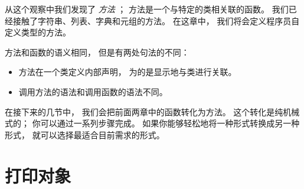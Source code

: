从这个观察中我们发现了 {\em 方法} ； 方法是一个与特定的类相关联的函数。
我们已经接触了字符串、列表、字典和元组的方法。
在这章中， 我们将会定义程序员自定义类型的方法。



方法和函数的语义相同， 但是有两处句法的不同：


\begin{itemize}

\item 方法在一个类定义内部声明， 为的是显示地与类进行关联。

\item 调用方法的语法和调用函数的语法不同。

\end{itemize}


在接下来的几节中，  我们会把前面两章中的函数转化为方法。
这个转化是纯机械式的； 你可以通过一系列步骤完成。
如果你能够轻松地将一种形式转换成另一种形式，  就可以选择最适合目前需求的形式。

\section{打印对象 }


